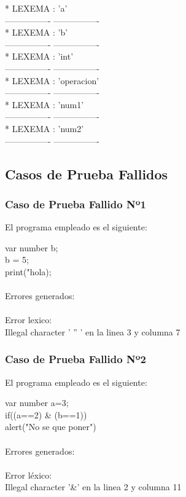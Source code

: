 \documentclass{article}
\begin{document}
\begin{flushleft}
*	LEXEMA : 'a'\\
---------------- ----------------\\
*	LEXEMA : 'b'\\
---------------- ----------------\\
*	LEXEMA : 'int'\\
---------------- ----------------\\
*	LEXEMA : 'operacion'\\
---------------- ----------------\\
*	LEXEMA : 'num1'\\
---------------- ----------------\\
*	LEXEMA : 'num2'\\
---------------- ----------------\\
\end{flushleft}
\clearpage
\subsection{Casos de Prueba Fallidos}
\subsubsection{Caso de Prueba Fallido Nº1}
\begin{center} 
El programa empleado es el siguiente:
\end{center}
\begin{flushleft}
var number b;\\
b = 5;\\
print("hola);\\
\quad\\
Errores generados:\\
\quad\\
Error lexico: \\
	\qquad Illegal character ' '' ' en la linea 3 y columna 7
\end{flushleft}

\subsubsection{Caso de Prueba Fallido Nº2}
\begin{center} 
El programa empleado es el siguiente:
\end{center}
\begin{flushleft}
var number a=3;\\
if((a==2) \& (b==1))\\
alert("No se que poner")\\
\quad\\
Errores generados:\\
\quad\\
Error léxico: \\
\qquad Illegal character '\&' en la linea 2 y columna 11
\end{flushleft}
\end{document}
